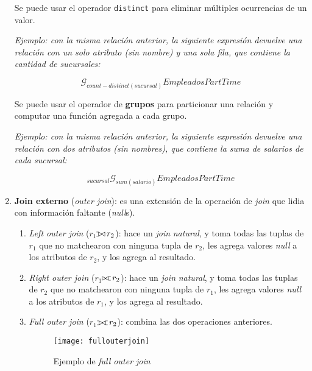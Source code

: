 \documentclass[a4paper, twoside]{article}
\def\ojoin{\setbox0=\hbox{$\bowtie$}%
  \rule[-.02ex]{.25em}{.4pt}\llap{\rule[\ht0]{.25em}{.4pt}}}
\def\leftouterjoin{\mathbin{\ojoin\mkern-5.8mu\bowtie}}
\def\rightouterjoin{\mathbin{\bowtie\mkern-5.8mu\ojoin}}
\def\fullouterjoin{\mathbin{\ojoin\mkern-5.8mu\bowtie\mkern-5.8mu\ojoin}}
\begin{document}
\begin{enumerate}
Se puede usar el operador \texttt{distinct} para eliminar múltiples
ocurrencias de un valor.


\emph{Ejemplo: con la misma relación anterior, la siguiente expresión
devuelve una relación con un solo atributo (sin nombre) y una sola
fila, que contiene la cantidad de sucursales:}


\[
\mathcal{G}_{count-distinct(sucursal)}EmpleadosPartTime
\]



Se puede usar el operador de \textbf{grupos}\textbf{\emph{ }}para
particionar una relación y computar una función agregada a cada grupo. 


\emph{Ejemplo: con la misma relación anterior, la siguiente expresión
devuelve una relación con dos atributos (sin nombres), que contiene
la suma de salarios de cada sucursal:}


\[
_{sucursal}\mathcal{G}_{sum(salario)}EmpleadosPartTime
\]


\item \textbf{Join externo} (\emph{outer join}): es una extensión de la
operación de \emph{join} que lidia con información faltante (\emph{null}s).

\begin{enumerate}
\item \emph{Left outer join} (\textbf{$r_{1}$$ $$\leftouterjoin\, r_{2}$}):
hace un \emph{join} \emph{natural}, y toma todas las tuplas de $r_{1}$
que no matchearon con ninguna tupla de $r_{2}$, les agrega valores
\emph{null} a los atributos de $r_{2}$, y los agrega al resultado.
\item \emph{Right outer join} (\textbf{$r_{1}$$\rightouterjoin\, r_{2}$}):
hace un \emph{join} \emph{natural}, y toma todas las tuplas de $r_{2}$
que no matchearon con ninguna tupla de $r_{1}$, les agrega valores
\emph{null} a los atributos de $r_{1}$, y los agrega al resultado.
\item \emph{Full outer join} (\textbf{$r_{1}$$\fullouterjoin\, r_{2}$}):
combina las dos operaciones anteriores.


\begin{figure}[H]
\noindent \begin{centering}
\texttt{[image: fullouterjoin]}
\par\end{centering}

\protect\caption{Ejemplo de \emph{full outer join}}


\end{figure}


\end{enumerate}
\end{enumerate}
\end{document}
